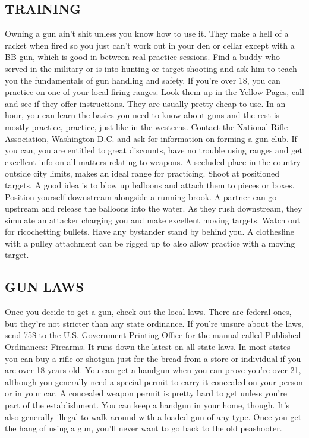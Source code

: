 \documentclass[11pt,twoside,a4paper]{book}
\begin{document}
\subsection{TRAINING}
Owning a gun ain't shit unless you know how to use it. They make a hell of a racket when fired so you just can't work out in your den or cellar except with a BB gun, which is good in between real practice sessions. Find a buddy who served in the military or is into hunting or target-shooting and ask him to teach you the fundamentals of gun handling and safety. If you're over 18, you can practice on one of your local firing ranges. Look them up in the Yellow Pages, call and see if they offer instructions. They are usually pretty cheap to use. In an hour, you can learn the basics you need to know about guns and the rest is mostly practice, practice, just like in the westerns. Contact the National Rifle Association, Washington D.C. and ask for information on forming a gun club. If you can, you are entitled to great discounts, have no trouble using ranges and get excellent info on all matters relating to weapons. A secluded place in the country outside city limits, makes an ideal range for practicing. Shoot at positioned targets. A good idea is to blow up balloons and attach them to pieces or boxes.  Position yourself downstream alongside a running brook. A partner can go upstream and release the balloons into the water. As they rush downstream, they simulate an attacker charging you and make excellent moving targets. Watch out for ricochetting bullets. Have any bystander stand by behind you. A clothesline with a pulley attachment can be rigged up to also allow practice with a moving target.

\subsection{GUN LAWS}

Once you decide to get a gun, check out the local laws. There are federal ones, but they're not stricter than any state ordinance. If you're unsure about the laws, send 75\$ to the U.S. Government Printing Office for the manual called Published Ordinances: Firearms. It runs down the latest on all state laws. In most states you can buy a rifle or shotgun just for the bread from a store or individual if you are over 18 years old. You can get a handgun when you can prove you're over 21, although you generally need a special permit to carry it concealed on your person or in  your car. A concealed weapon permit is pretty hard to get unless you're part of the establishment. You can keep a handgun in your home, though. It's also generally illegal to walk around with a loaded gun of any type. Once you get the hang of using a gun, you'll never want to go back to the old peashooter.
\end{document}
